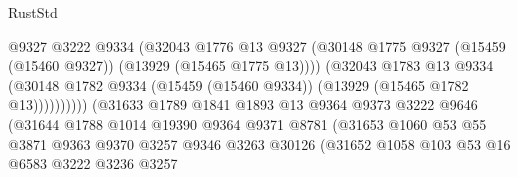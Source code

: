 \begin{lexlean}{RustStd}
\begin{coremodule}
                                          @9327
                                          @3222
                                          @9334
                                          (@32043
                                            @1776
                                            @13
                                            @9327
                                            (@30148
                                              @1775
                                              @9327
                                              (@15459 (@15460 @9327))
                                              (@13929 (@15465 @1775 @13))))
                                          (@32043
                                            @1783
                                            @13
                                            @9334
                                            (@30148
                                              @1782
                                              @9334
                                              (@15459 (@15460 @9334))
                                              (@13929 (@15465 @1782 @13))))))))))
                              (@31633
                                @1789
                                @1841
                                @1893
                                @13
                                @9364
                                @9373
                                @3222
                                @9646
                                (@31644
                                  @1788
                                  @1014
                                  @19390
                                  @9364
                                  @9371
                                  @8781
                                  (@31653
                                    @1060
                                    @53
                                    @55
                                    @3871
                                    @9363
                                    @9370
                                    @3257
                                    @9346
                                    @3263
                                    @30126
                                    (@31652
                                      @1058
                                      @103
                                      @53
                                      @16
                                      @6583
                                      @3222
                                      @3236
                                      @3257

\end{coremodule}
\end{lexlean}
